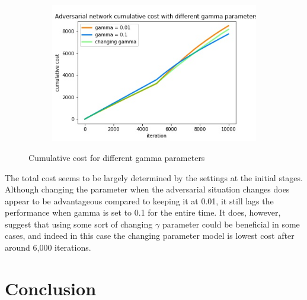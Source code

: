 \begin{figure}[ht!]
\centering
\begin{subfigure}{1.0\textwidth}
  \centering
  \includegraphics[width=10cm]{../plots/changing_gamma_cumul_cost.jpg}
\end{subfigure}
\caption{Cumulative cost for different gamma parameters}
\label{fig:gamma-effect}
\end{figure}

The total cost seems to be largely determined by the settings at the initial stages. Although changing the parameter when the adversarial situation changes does appear to be advantageous compared to keeping it at 0.01, it still lags the performance when gamma is set to 0.1 for the entire time. It does, however, suggest that using some sort of changing $\gamma$ parameter could be beneficial in some cases, and indeed in this case the changing parameter model is lowest cost after around 6,000 iterations.

\pagebreak

\section{Conclusion}





%
%


\newpage




